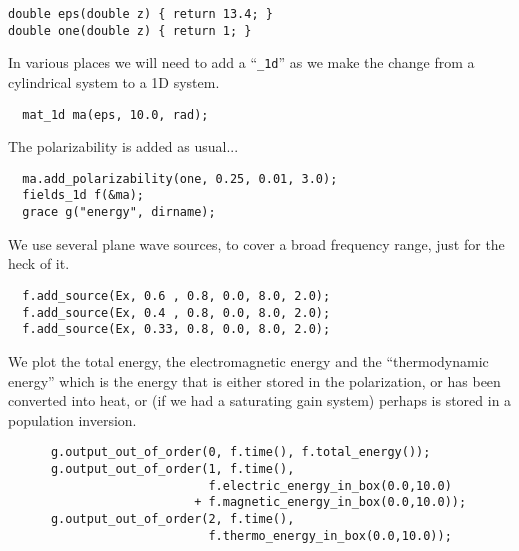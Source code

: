 \begin{verbatim}
double eps(double z) { return 13.4; }
double one(double z) { return 1; }
\end{verbatim}
\begin{comment}
int main(int argc, char **argv) {
  deal_with_ctrl_c();
  const double ttot = 600.0;
\end{comment}
In various places we will need to add a ``\verb!_1d!'' as we make the
change from a cylindrical system to a 1D system.
\begin{verbatim}
  mat_1d ma(eps, 10.0, rad);
\end{verbatim}
\begin{comment}
  const char *dirname = make_output_directory(argv[0]);
  ma.set_output_directory(dirname);
\end{comment}
The polarizability is added as usual...
\begin{verbatim}
  ma.add_polarizability(one, 0.25, 0.01, 3.0);
  fields_1d f(&ma);
  grace g("energy", dirname);
\end{verbatim}
We use several plane wave sources, to cover a broad frequency range, just
for the heck of it.
\begin{verbatim}
  f.add_source(Ex, 0.6 , 0.8, 0.0, 8.0, 2.0);
  f.add_source(Ex, 0.4 , 0.8, 0.0, 8.0, 2.0);
  f.add_source(Ex, 0.33, 0.8, 0.0, 8.0, 2.0);
\end{verbatim}
\begin{comment}
  double next_printtime = 10;
  while (f.time() < ttot && !interrupt) {
    if (f.time() >= next_printtime) {
      next_printtime += 10;
      printf("Working on time %
      printf("energy is %
\end{comment}
We plot the total energy, the electromagnetic energy and the
``thermodynamic energy'' which is the energy that is either stored in the
polarization, or has been converted into heat, or (if we had a saturating
gain system) perhaps is stored in a population inversion.
\begin{verbatim}
      g.output_out_of_order(0, f.time(), f.total_energy());
      g.output_out_of_order(1, f.time(),
                            f.electric_energy_in_box(0.0,10.0)
                          + f.magnetic_energy_in_box(0.0,10.0));
      g.output_out_of_order(2, f.time(),
                            f.thermo_energy_in_box(0.0,10.0));
\end{verbatim}
\begin{comment}
    }
    f.step();
  }
}
\end{comment}

